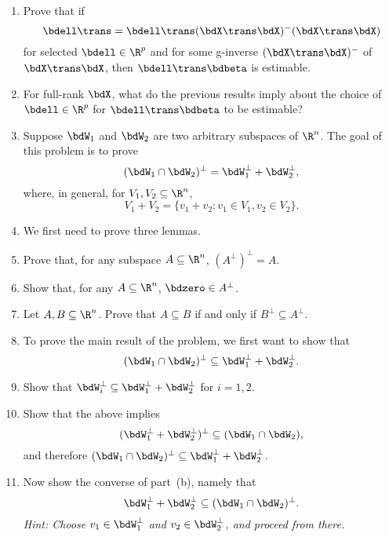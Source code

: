 \begin{enumerate}
\item
Prove that if 
\[
\bdell\trans = \bdell\trans (\bdX\trans\bdX)^{-}(\bdX\trans\bdX) 
\]
for selected $\bdell \in \R^p$ and for some g-inverse
$(\bdX\trans\bdX)^{-}$
of $\bdX\trans\bdX$, then
$\bdell\trans\bdbeta$ is estimable.

\item
For full-rank $\bdX$, what do the previous results imply about the choice
of $\bdell \in \R^p$ for $\bdell\trans\bdbeta$ to be estimable?
\ee

\item 
Suppose $\bdW_1$ and $\bdW_2$ are two arbitrary subspaces of $\R^n$.
The goal of this problem is to prove
\[
(\bdW_1 \cap \bdW_2)^\perp
=
\bdW_1^\perp + \bdW_2^\perp,
\]
where, in general, for $V_1, V_2 \subseteq \R^n$,
\[
V_1 + V_2 = \{v_1 + v_2 : v_1\in V_1, v_2\in V_2\}.
\]

\be
\item 
We first need to prove three lemmas.
\be
\item 
Prove that,
for any subspace $A \subseteq \R^n$, $(A^\perp)^\perp = A$.
\item 
Show that, for any $A \subseteq \R^n$, $\bdzero \in A^\perp$.
\item 
Let $A,B \subseteq \R^n$.
Prove that $A\subseteq B$ if and only if 
$B^\perp \subseteq A^\perp$.
\ee
\item 
To prove the main result of the problem, we first want to show that 
\[
(\bdW_1 \cap \bdW_2)^\perp
\subseteq
\bdW_1^\perp + \bdW_2^\perp.
\]
\be
\item 
Show that $\bdW_i^\perp \subseteq \bdW_1^\perp + \bdW_2^\perp$ for $i=1,2$.
\item 
Show that the above implies 
\[
(\bdW_1^\perp + \bdW_2^\perp)^\perp \subseteq (\bdW_1 \cap\bdW_2),
\]
and therefore $(\bdW_1 \cap \bdW_2)^\perp
\subseteq
\bdW_1^\perp + \bdW_2^\perp$.
\ee
\item 
Now show the converse of part~(b), namely that
\[
\bdW_1^\perp + \bdW_2^\perp
\subseteq
(\bdW_1 \cap \bdW_2)^\perp.
\]
{\em Hint:  Choose
$v_1 \in \bdW_1^\perp$ and $v_2 \in \bdW_2^\perp$,
and proceed from there.}
\ee

\end{enumerate}

